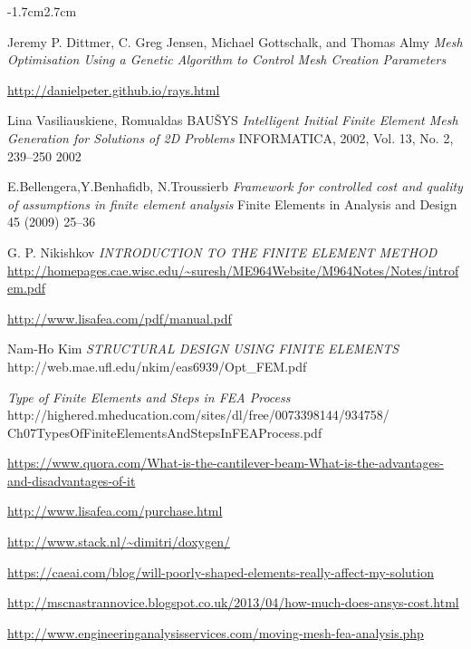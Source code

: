 \documentclass{article}
\newcommand{\CMwidth}{-1.7cm}
\newcommand{\CMheight}{2.7cm}
\begin{document}
\begin{changemargin}{\CMwidth}{\CMheight}
\begin{thebibliography}{9}
 Jeremy P. Dittmer, C. Greg Jensen, Michael Gottschalk, and Thomas Almy \emph{Mesh Optimisation Using a Genetic Algorithm to Control Mesh Creation Parameters}

 \url{http://danielpeter.github.io/rays.html}

 Lina Vasiliauskiene, Romualdas BAUŠYS \emph{Intelligent Initial Finite Element Mesh Generation for Solutions of 2D Problems} INFORMATICA, 2002, Vol. 13, No. 2, 239–250 2002

 E.Bellengera,Y.Benhafidb, N.Troussierb \emph{Framework for controlled cost and quality of assumptions in finite element analysis} Finite Elements in Analysis and Design 45 (2009) 25--36

 G. P. Nikishkov \emph{INTRODUCTION TO THE FINITE ELEMENT METHOD} \url{http://homepages.cae.wisc.edu/~suresh/ME964Website/M964Notes/Notes/introfem.pdf}

 \url{http://www.lisafea.com/pdf/manual.pdf}

Nam-Ho Kim \emph{STRUCTURAL DESIGN USING FINITE ELEMENTS} http://web.mae.ufl.edu/nkim/eas6939/Opt\_FEM.pdf

\emph{Type of Finite Elements and Steps in FEA Process}\\
http://highered.mheducation.com/sites/dl/free/0073398144/934758/\\Ch07TypesOfFiniteElementsAndStepsInFEAProcess.pdf 

 \url{https://www.quora.com/What-is-the-cantilever-beam-What-is-the-advantages-and-disadvantages-of-it}

 \url{http://www.lisafea.com/purchase.html}

 \url{http://www.stack.nl/~dimitri/doxygen/} 

 \url{https://caeai.com/blog/will-poorly-shaped-elements-really-affect-my-solution}

 \url{http://mscnastrannovice.blogspot.co.uk/2013/04/how-much-does-ansys-cost.html}

 \url{http://www.engineeringanalysisservices.com/moving-mesh-fea-analysis.php}

\end{thebibliography}

\end{changemargin}
\end{document}
